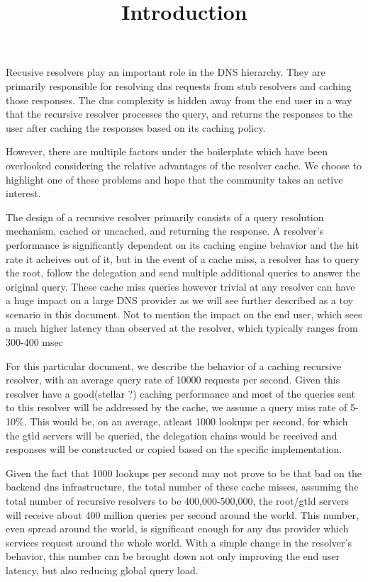 \documentclass{article} 
\begin{document}
\title{Introduction}

Recusive resolvers play an important role in the DNS hierarchy. They
are primarily responsible for resolving dns requests from stub
resolvers and caching those responses. The dns complexity is hidden
away from the end user in a way that the recursive resolver processes
the query, and returns the responses to the user after caching the
responses based on its caching policy.

However, there are multiple factors under the boilerplate which have
been overlooked considering the relative advantages of the resolver
cache. We choose to highlight one of these problems and hope that the
community takes an active interest.

The design of a recursive resolver primarily consists of a query
resolution mechanism, cached or uncached, and returning the
response. A resolver's performance is significantly dependent on its
caching engine behavior and the hit rate it acheives out of it, but in
the event of a cache miss, a resolver has to query the root, follow
the delegation and send multiple additional queries to answer the
original query. These cache miss queries however trivial at any
resolver can have a huge impact on a large DNS provider as we will see
further described as a toy scenario in this document. Not to mention
the impact on the end user, which sees a much higher latency than
observed at the resolver, which typically ranges from 300-400 msec

For this particular document, we describe the behavior of a caching
recursive resolver, with an average query rate of 10000 requests per
second. Given this resolver have a good(stellar ?) caching performance
and most of the queries sent to this resolver will be addressed by the
cache, we assume a query miss rate of 5-10\%. This would be, on an
average, atleast 1000 lookups per second, for which the gtld servers
will be queried, the delegation chains would be received and responses
will be constructed or copied based on the specific implementation.
    
Given the fact that 1000 lookups per second may not prove to be that
bad on the backend dns infrastructure, the total number of these cache
misses, assuming the total number of recursive resolvers to be
400,000-500,000, the root/gtld servers will receive about 400 million
queries per second around the world. This number, even spread around
the world, is significant enough for any dns provider which services
request around the whole world. With a simple change in the resolver's
behavior, this number can be brought down not only improving the end
user latency, but also reducing global query load.
\end{document}
